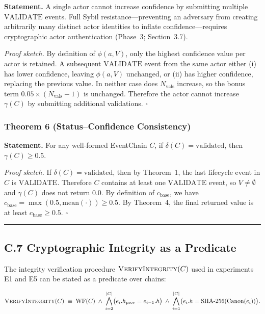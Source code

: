 \textbf{Statement.} A single actor cannot increase confidence by submitting multiple $\text{VALIDATE}$ events. Full Sybil resistance---preventing an adversary from creating arbitrarily many distinct actor identities to inflate confidence---requires cryptographic actor authentication (Phase~3; Section~3.7).

\emph{Proof sketch.} By definition of $\phi(a, V)$, only the highest confidence value per actor is retained. A subsequent $\text{VALIDATE}$ event from the same actor either (i) has lower confidence, leaving $\phi(a, V)$ unchanged, or (ii) has higher confidence, replacing the previous value. In neither case does $N_{\text{vals}}$ increase, so the bonus term $0.05 \times (N_{\text{vals}} - 1)$ is unchanged. Therefore the actor cannot increase $\gamma(C)$ by submitting additional validations. $\square$

\subsubsection{Theorem 6 (Status--Confidence Consistency)}\label{c.6.8-theorem-6-statusconfidence-consistency}

\textbf{Statement.} For any well-formed EventChain $C$, if $\delta(C) = \text{validated}$, then $\gamma(C) \geq 0.5$.

\emph{Proof sketch.} If $\delta(C) = \text{validated}$, then by Theorem~1, the last lifecycle event in $C$ is $\text{VALIDATE}$. Therefore $C$ contains at least one $\text{VALIDATE}$ event, so $V \neq \emptyset$ and $\gamma(C)$ does not return 0.0. By definition of $c_{\text{base}}$, we have $c_{\text{base}} = \max(0.5, \text{mean}(\cdot)) \geq 0.5$. By Theorem~4, the final returned value is at least $c_{\text{base}} \geq 0.5$. $\square$

\begin{center}\rule{0.5\linewidth}{0.5pt}\end{center}


\subsection{C.7 Cryptographic Integrity as a Predicate}\label{c.7-cryptographic-integrity-as-a-predicate}

The integrity verification procedure $\textsc{VerifyIntegrity}(C)$ used in experiments E1 and E5 can be stated as a predicate over chains:

\begin{equation}
\textsc{VerifyIntegrity}(C) \;\equiv\; \text{WF}(C) \;\land\; \bigwedge_{i=2}^{|C|} \bigl(e_i.h_{\text{prev}} = e_{i-1}.h\bigr) \;\land\; \bigwedge_{i=1}^{|C|} \bigl(e_i.h = \text{SHA-256}(\text{Canon}(e_i))\bigr).
\end{equation}

